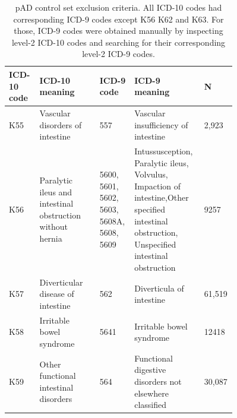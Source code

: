 \begin{table}[H]
  \caption{pAD control set exclusion criteria. All ICD-10 codes had corresponding ICD-9 codes except K56 K62 and K63. For those, ICD-9 codes were obtained manually by inspecting level-2 ICD-10 codes and searching for their corresponding level-2 ICD-9 codes.}
  \label{table:ukbb_ctrl_excl_criteria}
  \fontsize{10}{11}\selectfont

  \begin{tabular}{|p{0.1\linewidth}|p{0.25\linewidth}|p{0.1\linewidth}|p{0.25\linewidth}|p{0.06\linewidth}|}
  \hline
  \textbf{ICD-10 code} & \textbf{ICD-10
   meaning}                                            & \textbf{ICD-9 code}                          & \textbf{ICD-9 meaning}     & \textbf{N}                                                                                                                                                          \\ \hline
  K55         & Vascular disorders of intestine                           & 557                                 & Vascular insufficiency of intestine       & 2,923                                                                                                                                  \\ \hline
  K56         & Paralytic ileus and intestinal obstruction without hernia & 5600, 5601, 5602, 5603, 5608A, 5608, 5609 & Intussusception, Paralytic ileus, Volvulus, Impaction of intestine,Other specified intestinal obstruction, Unspecified intestinal obstruction & 9257                              \\ \hline
  K57         & Diverticular disease of intestine                         & 562                                 & Diverticula of intestine              &     61,519                                                                                                                                  \\ \hline
  K58         & Irritable bowel syndrome                                  & 5641                                & Irritable bowel syndrome          & 12418                                                                                                                                          \\ \hline
  K59         & Other functional intestinal disorders                     & 564                                 & Functional digestive disorders not elsewhere classified      & 30,087                                                                                                               \\ \hline

\end{tabular}
\end{table}
